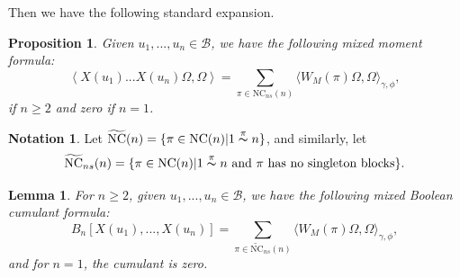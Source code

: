 \documentclass[12pt]{amsart}
\newtheorem{Prop}[Thm]{Proposition}
\newtheorem{Lemma}[Thm]{Lemma}
\theoremstyle{definition}
\newtheorem{Notation}[Thm]{Notation}
\newcommand{\ip}[2]{\left \langle{#1},{#2} \right \rangle}
\begin{document}
	Then we have the following standard expansion.

\begin{Prop}
\label{Prop:moments}
Given $u_1, ..., u_n\in\mathcal{B}$, we have the following mixed moment formula:
\begin{equation}
\ip{X(u_1)...X(u_n) \Omega}{\Omega} = \sum_{\pi\in\mathrm{NC}_{ns}(n)} \langle W_M(\pi) \Omega,\Omega\rangle_{\gamma,\phi},
\end{equation}
if $n \geq 2$ and zero if $n=1$.
\end{Prop}


\begin{Notation}
	Let $\widetilde{\mathrm{NC}}(n) = \{\pi\in\mathrm{NC}(n) | 1 \overset{\pi}{\thicksim} n \}$, and similarly, let
\[
\widetilde{\mathrm{NC}}_{ns}(n) = \{\pi\in\mathrm{NC}(n) | 1 \overset{\pi}{\thicksim} n \text{ and }\pi \text{ has no singleton blocks} \}.
\]
\end{Notation}

\begin{Lemma}
\label{Lemma:Boolean}
For $n\geq 2$, given $u_1, ..., u_n\in\mathcal{B}$, we have the following mixed Boolean cumulant formula:
\begin{equation}
B_n[X(u_1), ..., X(u_n)] = \sum_{\pi\in \widetilde{\mathrm{NC}}_{ns}(n)} \langle W_M(\pi)\Omega, \Omega \rangle_{\gamma,\phi},
\end{equation}
and for $n=1$, the cumulant is zero.
\end{Lemma}
\end{document}

